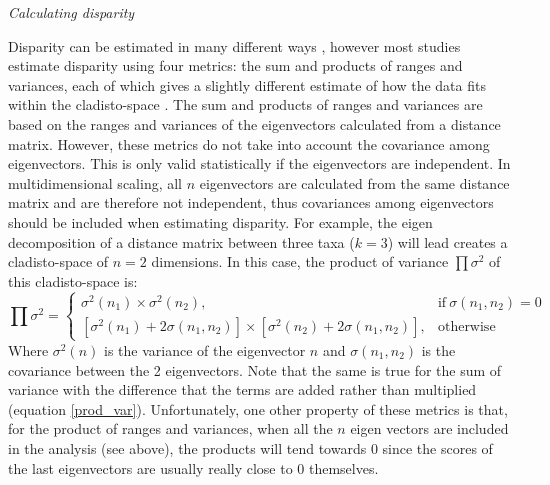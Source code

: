 \documentclass[12pt,letterpaper]{article}
\renewcommand{\subsection}[1]{%
\bigskip
\begin{center}
\begin{large}
\normalfont\itshape #1
\end{large}
\end{center}}
\begin{document}
\subsection{Calculating disparity}
Disparity can be estimated in many different ways \citep[e.g.][]{Wills1994,Ciampaglio2004,thorneresetting2011,hopkinsdecoupling2013,huang2015origins}, however most studies estimate disparity using four metrics: the sum and products of ranges and variances, each of which gives a slightly different estimate of how the data fits within the cladisto-space \citep{Foote01071994,Wills1994,brusatte50,Brusatte12092008,cisneros2010,thorneresetting2011,prentice2011,brusattedinosaur2012,toljagictriassic-jurassic2013,ruta2013,bentonmodels2014,bensonfaunal2014}.
The sum and products of ranges and variances are based on the ranges and variances of the eigenvectors calculated from a distance matrix. %
However, these metrics do not take into account the covariance among eigenvectors.
This is only valid statistically if the eigenvectors are independent.
In multidimensional scaling, all $n$ eigenvectors are calculated from the same distance matrix and are therefore not independent, thus covariances among eigenvectors should be included when estimating disparity.
For example, the eigen decomposition of a distance matrix between three taxa ($k=3$) will lead creates a cladisto-space of $n=2$ dimensions.
In this case, the product of variance $\prod\sigma^2$ of this cladisto-space is:
\begin{equation}
    \prod\sigma^2=
    \begin{cases}
      \sigma^2(n_1) \times \sigma^2(n_2), & \text{if}\ \sigma(n_1,n_2)=0 \\
      [\sigma^2(n_1)+2\sigma(n_1,n_2)] \times [\sigma^2(n_2)+2\sigma(n_1,n_2)], & \text{otherwise}
    \end{cases}
    \label{prod_var}
\end{equation}
Where $\sigma^2(n)$ is the variance of the eigenvector $n$ and $\sigma(n_{1}, n_{2})$ is the covariance between the 2 eigenvectors.
Note that the same is true for the sum of variance with the difference that the terms are added rather than multiplied (equation \ref{prod_var}).
Unfortunately, one other property of these metrics is that, for the product of ranges and variances, when all the $n$ eigen vectors are included in the analysis (see above), the products will tend towards 0 since the scores of the last eigenvectors are usually really close to 0 themselves.
\end{document}
